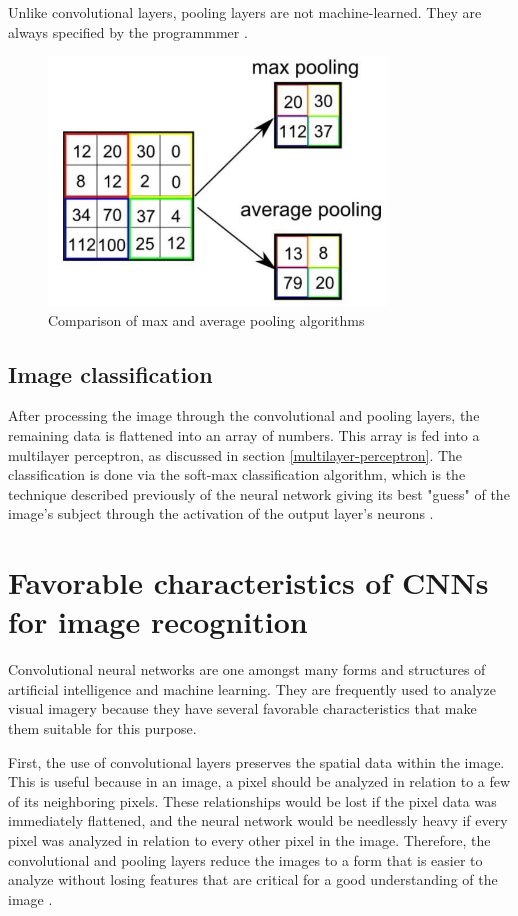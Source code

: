 \documentclass[12pt,a4paper,notitlepage]{article}
\begin{document}
Unlike convolutional layers, pooling layers are not machine-learned. They are always specified by the programmmer \cite{brownlee_gentle_2019}.

\begin{figure}[htbp]
	\centering
		\includegraphics[width=0.80\textwidth]{images/pooling.jpg}
	\caption{Comparison of max and average pooling algorithms \cite{saha_comprehensive_2018}}
	\label{fig:pooling}
\end{figure}

\subsection{Image classification}
After processing the image through the convolutional and pooling layers, the remaining data is flattened into an array of numbers. This array is fed into a multilayer perceptron, as discussed in section \ref{multilayer-perceptron}. The classification is done via the soft-max classification algorithm, which is the technique described previously of the neural network giving its best "guess" of the image's subject through the activation of the output layer's neurons \cite{rosebrock_softmax_2016}.

\section{Favorable characteristics of CNNs for image recognition}
Convolutional neural networks are one amongst many forms and structures of artificial intelligence and machine learning. They are frequently used to analyze visual imagery because they have several favorable characteristics that make them suitable for this purpose.

First, the use of convolutional layers preserves the spatial data within the image. This is useful because in an image, a pixel should be analyzed in relation to a few of its neighboring pixels. These relationships would be lost if the pixel data was immediately flattened, and the neural network would be needlessly heavy if every pixel was analyzed in relation to every other pixel in the image. Therefore, the convolutional and pooling layers reduce the images to a form that is easier to analyze without losing features that are critical for a good understanding of the image \cite{saha_comprehensive_2018}.
\end{document}
